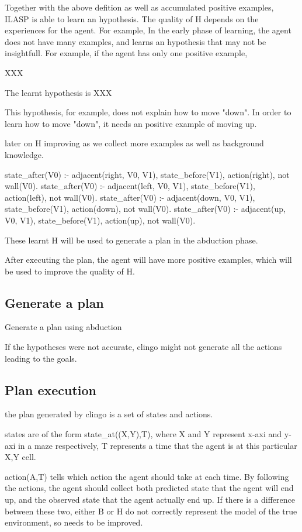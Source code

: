 Together with the above defition as well as accumulated positive examples, ILASP is able to learn an hypothesis. The quality of H depends on the experiences for the agent. 
For example, In the early phase of learning, the agent does not have many examples, and learns an hypothesis that may not be insightfull. 
For example, if the agent has only one positive example, 

XXX

The learnt hypothesis is XXX

This hypothesis, for example, does not explain how to move "down". In order to learn how to move "down", it needs an positive example of moving up. 

later on H improving as we collect more examples as well as background knowledge.

state\_after(V0) :- adjacent(right, V0, V1), state\_before(V1), action(right), not wall(V0).
state\_after(V0) :- adjacent(left, V0, V1), state\_before(V1), action(left), not wall(V0).
state\_after(V0) :- adjacent(down, V0, V1), state\_before(V1), action(down), not wall(V0).
state\_after(V0) :- adjacent(up, V0, V1), state\_before(V1), action(up), not wall(V0).

These learnt H will be used to generate a plan in the abduction phase. 

After executing the plan, the agent will have more positive examples, which will be used to improve the quality of H. 

\subsection{Generate a plan}
\label{Generate a plan}

Generate a plan using abduction

If the hypotheses were not accurate, clingo might not generate all the actions leading to the goals. 

\subsection{Plan execution}
\label{Plan execution}

the plan generated by clingo is a set of states and actions. 

states are of the form state\_at((X,Y),T), where X and Y represent x-axi and y-axi in a maze respectively, T represents a time that the agent is at 
this particular X,Y cell. 

action(A,T) tells which action the agent should take at each time. By following the actions, the agent should collect both predicted state that the 
agent will end up, and the observed state that the agent actually end up. If there is a difference between these two, either B or H do not correctly represent
the model of the true environment, so needs to be improved. 

